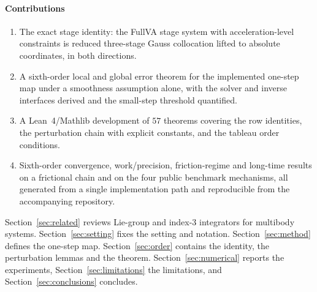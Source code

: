 \paragraph{Contributions}
\begin{enumerate}
  \item The exact stage identity: the FullVA stage system with acceleration-level constraints is
  reduced three-stage Gauss collocation lifted to absolute coordinates, in both directions.
  \item A sixth-order local and global error theorem for the implemented one-step map under a
  smoothness assumption alone, with the solver and inverse interfaces derived and the small-step
  threshold quantified.
  \item A Lean~4/Mathlib development of $57$ theorems covering the row identities, the perturbation
  chain with explicit constants, and the tableau order conditions.
  \item Sixth-order convergence, work/precision, friction-regime and long-time results on a
  frictional chain and on the four public benchmark mechanisms, all generated from a single
  implementation path and reproducible from the accompanying repository.
\end{enumerate}

Section~\ref{sec:related} reviews Lie-group and index-3 integrators for multibody systems.
Section~\ref{sec:setting} fixes the setting and notation. Section~\ref{sec:method} defines the
one-step map. Section~\ref{sec:order} contains the identity, the perturbation lemmas and the
theorem. Section~\ref{sec:numerical} reports the experiments, Section~\ref{sec:limitations} the
limitations, and Section~\ref{sec:conclusions} concludes.
